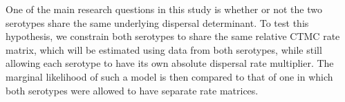 \documentclass[10pt]{article}
\begin{document}
One of the main research questions in this study is whether or not the two serotypes share the same underlying dispersal determinant. 
To test this hypothesis, we constrain both serotypes to share the same relative CTMC rate matrix, which will be estimated using data from both serotypes,
%
while still allowing each serotype to have its own absolute dispersal rate multiplier.
The marginal likelihood of such a model is then compared to that of one in which both serotypes were allowed to have separate rate matrices.
\end{document}
